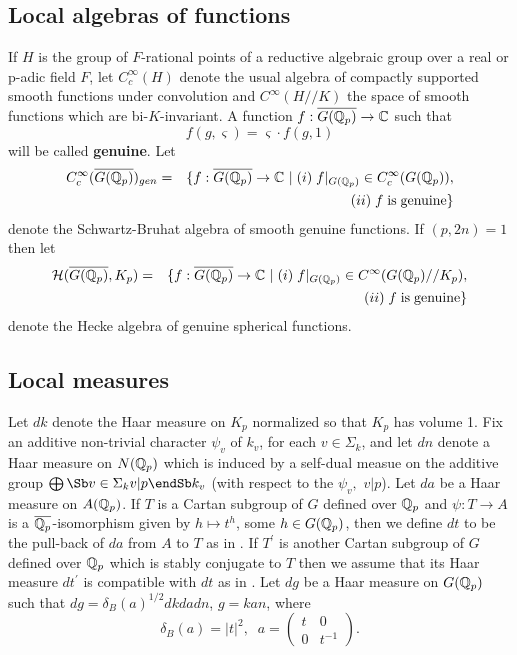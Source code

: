 \subsection{Local algebras of functions}

If $H$ is the group of $F$-rational points of a reductive algebraic group
over a real or p-adic field $F$, let $C_c^\infty (H)$ denote the usual
algebra of compactly supported smooth functions under convolution and $%
C^\infty (H//K)$ the space of smooth functions which are bi-$K$-invariant. A
function $f:\overline{G({\Bbb{Q}}_p)}\rightarrow {\Bbb{C}}$ such that 
\begin{equation}
f(g,\varsigma )=\varsigma \cdot f(g,1)
\end{equation}
will be called \textbf{genuine}. Let 
\begin{eqnarray*}
C_c^\infty (\overline{G({\Bbb{Q}}_p)})_{gen}
&=&\{f:\overline{G({\Bbb{Q}}_p)}%
\rightarrow {\Bbb{C}}\
|\;(i)\;f|_{G({\Bbb{Q}}_p)}\in C_c^\infty (G({\Bbb{Q}}_p)),
\\
&&(ii)\;f\;\mathrm{is\;genuine}\}
\end{eqnarray*}
denote the Schwartz-Bruhat algebra of smooth genuine functions.
If $(p,2n)=1$ then let 
\begin{eqnarray*}
{\cal{H}}(\overline{G({\Bbb{Q}}_p)},K_p)
&=&\{f:\overline{G({\Bbb{Q}}_p)}\rightarrow {\Bbb{C}}
\ |\;(i)\;f|_{G({\Bbb{Q}}_p)}\in
C^\infty (G({\Bbb{Q}}_p)//K_p), \\
&&\ (ii)\;f\;\mathrm{is\;genuine}\}
\end{eqnarray*}
denote the Hecke algebra of genuine spherical functions.

\subsection{Local measures}

Let $dk$ denote the Haar measure on $K_p$ normalized so that $K_p$ has
volume 1. Fix an additive non-trivial character $\psi _v$ of
$k_v$, for each $v\in \Sigma _k$, and let $dn$ denote a Haar
measure on $N({\Bbb{Q}}_p)$
which is induced by a self-dual measue on the additive group
$\bigoplus\Sb v\in \Sigma _k  \\ v|p  \endSb k_v$
(with respect to the $\psi _v,$ $v|p$).
Let $da$ be a Haar measure on $A({\Bbb{Q}}_p)$. If $T$ is a
Cartan subgroup of 
$G$ defined over ${\Bbb{Q}}_p$ and $\psi :T\rightarrow A$
is a $\overline{\Bbb{Q}_p}$-isomorphism given by
$h\longmapsto t^h$, some $h\in G({\Bbb{Q}}_p)$,
then we define $dt$ to be the pull-back of $da$ from $A$ to $T$ as in
\cite{R}.
If $T^{\prime }$ is another Cartan subgroup of $G$ defined over ${\Bbb{Q}}_p$
which is stably conjugate to $T$ then we assume that its Haar measure
$dt^{\prime }$ is compatible with $dt$ as in
\cite{R}. Let $dg$ be a Haar measure
on $G({\Bbb{Q}}_p)$ such that $dg=\delta _B(a)^{1/2}dkdadn$, $g=kan$, where 
\begin{equation}
\delta _B(a)=|t|^2,\;\;a=\left( 
\begin{array}{cc}
t & 0 \\ 
0 & t^{-1}
\end{array}
\right) .
\end{equation}

